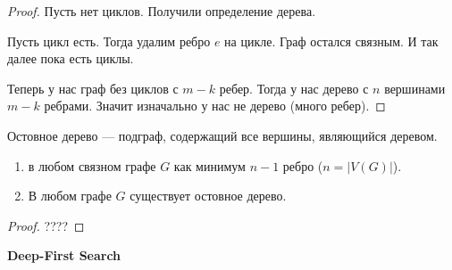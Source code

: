 \begin{proof}
    Пусть нет циклов. Получили определение дерева.

    Пусть цикл есть. Тогда удалим ребро $e$ на цикле. Граф остался связным. И так далее пока есть циклы.

    Теперь у нас граф без циклов с  $m-k$ ребер. Тогда у нас дерево с  $n$ вершинами  $m-k$ ребрами. Значит изначально у нас не дерево (много ребер).
\end{proof}
\begin{definition}
    Остовное дерево --- подграф, содержащий все вершины, являющийся деревом.
\end{definition}
\begin{consequence}
    \slashn
    \begin{enumerate}
        \item в любом связном графе $G$ как минимум  $n-1$ ребро ($n = |V(G)|$).
        \item В любом графе $G$ существует остовное дерево.
    \end{enumerate}
\end{consequence}
\begin{proof}
    ????
\end{proof}

\textbf{Deep-First Search}

